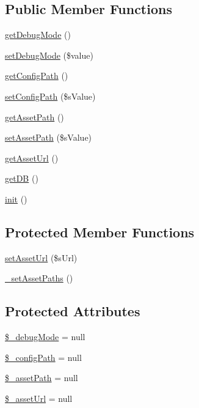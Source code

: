 \subsection*{Public Member Functions}
\begin{DoxyCompactItemize}
\item 
\hyperlink{classCPSWebModule_aef403af504f818f9acbff3caaa01cf69}{getDebugMode} ()
\item 
\hyperlink{classCPSWebModule_a801a26c6b865883afdac89cbcc3a07c3}{setDebugMode} (\$value)
\item 
\hyperlink{classCPSWebModule_ae21d2d711f414697477df2a4726e8daf}{getConfigPath} ()
\item 
\hyperlink{classCPSWebModule_a8115b613ae055d17768f138534ac45f3}{setConfigPath} (\$sValue)
\item 
\hyperlink{classCPSWebModule_a5b344fe2f40c0f235b4ede8e1c1ea4a3}{getAssetPath} ()
\item 
\hyperlink{classCPSWebModule_af9acd3d053a814ffec785ab8d9c24d82}{setAssetPath} (\$sValue)
\item 
\hyperlink{classCPSWebModule_a7d8986335d8119f7e20f5b9a4c1f15f7}{getAssetUrl} ()
\item 
\hyperlink{classCPSWebModule_a4162847310de81b83504109485866a7c}{getDB} ()
\item 
\hyperlink{classCPSWebModule_a4be4055f3361d4800e16bc2e2e38cda6}{init} ()
\end{DoxyCompactItemize}
\subsection*{Protected Member Functions}
\begin{DoxyCompactItemize}
\item 
\hyperlink{classCPSWebModule_aa7790060a53895524f446d7e4ef8131e}{setAssetUrl} (\$sUrl)
\item 
\hyperlink{classCPSWebModule_a233a839508289d6db0e8ae92c65bb7d6}{\_\-setAssetPaths} ()
\end{DoxyCompactItemize}
\subsection*{Protected Attributes}
\begin{DoxyCompactItemize}
\item 
\hyperlink{classCPSWebModule_a1768a9df40beec6e4b8c6d853396bb81}{\$\_\-debugMode} = null
\item 
\hyperlink{classCPSWebModule_a05a571c47e275207658ec3ff2a228291}{\$\_\-configPath} = null
\item 
\hyperlink{classCPSWebModule_a4bce993140269e2ecd8ab4243735e621}{\$\_\-assetPath} = null
\item 
\hyperlink{classCPSWebModule_a181134a3a040d43e6913ad39fa94ee66}{\$\_\-assetUrl} = null
\end{DoxyCompactItemize}


